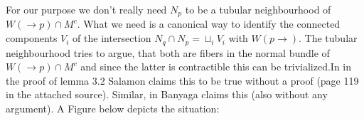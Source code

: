 \begin{remark}
	For our purpose we don't really need $N_p$ to be a tubular neighbourhood of $W(\to p)\cap M^c$. What we need is a canonical way to identify the connected components $V_i$ of the intersection $N_q\cap N_p=\sqcup_i V_i$ with $W(p\to)$. The tubular neighbourhood tries to argue, that both are fibers in the normal bundle of $W(\to p)\cap M^c$ and since the latter is contractible this can be trivialized.In \cite{MorseTheorySalmbon} in the proof of lemma 3.2 Salamon claims this to be true without a proof (page 119 in the attached source). Similar, in \cite{banyaga2004lectures} Banyaga claims this (also without any argument). A Figure below depicts the situation:
   \begin{center}
	
	
\end{center}
\end{remark}
